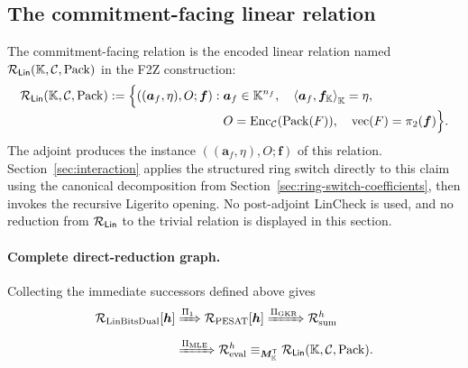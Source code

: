 \subsection{The commitment-facing linear relation}

The commitment-facing relation is the encoded linear relation named
$\mathcal R_{\mathsf{Lin}}(\mathbb K,\mathcal C,\operatorname{Pack})$ in the F2Z construction:
\begin{align}
 \mathcal R_{\mathsf{Lin}}(\mathbb K,\mathcal C,\operatorname{Pack}):=
 \Bigl\{((\bm a_f,\eta),O;\bm f):\;&
  \bm a_f\in\mathbb K^{n_f},\quad
  \left\langle\bm a_f,\bm f_{\mathbb K}\right\rangle_{\mathbb K}=\eta,
  \notag\\[-2pt]
 &O=\operatorname{Enc}_{\mathcal C}(\operatorname{Pack}(F)),\quad
  \operatorname{vec}(F)=\pi_2(\bm f)
 \Bigr\}.
 \label{eq:rel-lin-f}
\end{align}
The adjoint produces the instance $((\bm a_f,\eta),O;\bm f)$ of this relation.
Section~\ref{sec:interaction} applies the structured ring switch directly to
this claim using the canonical decomposition from
Section~\ref{sec:ring-switch-coefficients}, then invokes the recursive Ligerito
opening.  No post-adjoint LinCheck is used, and no reduction from $\mathcal R_{\mathsf{Lin}}$ to the
trivial relation is displayed in this section.

\paragraph{Complete direct-reduction graph.}
Collecting the immediate successors defined above gives
\begin{equation}
 \begin{aligned}
 \mathcal R_{\rm LinBitsDual}[\bm h]
 &\xRightarrow{\Pi_1}
   \mathcal R_{\rm PESAT}[\bm h]
 \xRightarrow{\Pi_{\rm GKR}}
   \mathcal R_{\rm sum}^{h}
 \\[2pt]
 &\xRightarrow{\Pi_{\rm MLE}}
   \mathcal R_{\rm eval}^{h}
 \equiv_{\bm M_{\mathbb K}^{\mathsf T}}
   \mathcal R_{\mathsf{Lin}}(\mathbb K,\mathcal C,\operatorname{Pack}).
 \end{aligned}
 \label{eq:solid-reduction-graph}
\end{equation}

\endgroup

